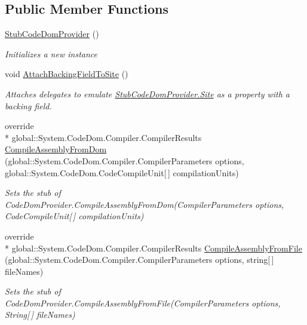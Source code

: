 \subsection*{Public Member Functions}
\begin{DoxyCompactItemize}
\item 
\hyperlink{class_system_1_1_code_dom_1_1_compiler_1_1_fakes_1_1_stub_code_dom_provider_a421fa030700795db39497dc6d2c02a4d}{Stub\-Code\-Dom\-Provider} ()
\begin{DoxyCompactList}\small\item\em Initializes a new instance\end{DoxyCompactList}\item 
void \hyperlink{class_system_1_1_code_dom_1_1_compiler_1_1_fakes_1_1_stub_code_dom_provider_a96522222f511600949e061130a49e869}{Attach\-Backing\-Field\-To\-Site} ()
\begin{DoxyCompactList}\small\item\em Attaches delegates to emulate \hyperlink{class_system_1_1_code_dom_1_1_compiler_1_1_fakes_1_1_stub_code_dom_provider_a78c3b0432eff0242c630a8b2aaf47242}{Stub\-Code\-Dom\-Provider.\-Site} as a property with a backing field.\end{DoxyCompactList}\item 
override \\*
global\-::\-System.\-Code\-Dom.\-Compiler.\-Compiler\-Results \hyperlink{class_system_1_1_code_dom_1_1_compiler_1_1_fakes_1_1_stub_code_dom_provider_a495d8bce074759a8647f8702ec766845}{Compile\-Assembly\-From\-Dom} (global\-::\-System.\-Code\-Dom.\-Compiler.\-Compiler\-Parameters options, global\-::\-System.\-Code\-Dom.\-Code\-Compile\-Unit\mbox{[}$\,$\mbox{]} compilation\-Units)
\begin{DoxyCompactList}\small\item\em Sets the stub of Code\-Dom\-Provider.\-Compile\-Assembly\-From\-Dom(\-Compiler\-Parameters options, Code\-Compile\-Unit\mbox{[}$\,$\mbox{]} compilation\-Units)\end{DoxyCompactList}\item 
override \\*
global\-::\-System.\-Code\-Dom.\-Compiler.\-Compiler\-Results \hyperlink{class_system_1_1_code_dom_1_1_compiler_1_1_fakes_1_1_stub_code_dom_provider_a2d08b7b8292a05a0df2ea5de1a568dde}{Compile\-Assembly\-From\-File} (global\-::\-System.\-Code\-Dom.\-Compiler.\-Compiler\-Parameters options, string\mbox{[}$\,$\mbox{]} file\-Names)
\begin{DoxyCompactList}\small\item\em Sets the stub of Code\-Dom\-Provider.\-Compile\-Assembly\-From\-File(\-Compiler\-Parameters options, String\mbox{[}$\,$\mbox{]} file\-Names)\end{DoxyCompactList}\item 

\end{DoxyCompactItemize}

